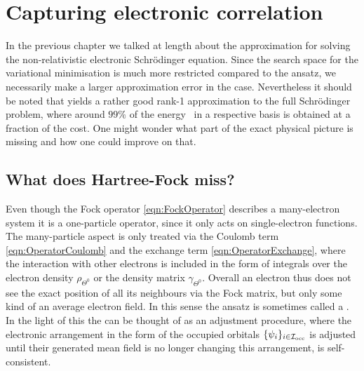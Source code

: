 \section{Capturing electronic correlation}
\label{sec:Correlation}

In the previous chapter we talked at length about the \HF approximation for solving
the non-relativistic electronic Schrödinger equation.
Since the search space for the variational minimisation is much more restricted compared
to the \FCI ansatz,
we necessarily make a larger approximation error in the \HF case.
Nevertheless it should be noted that \HF yields a rather good rank-1
approximation to the full Schrödinger problem,
where around $99\%$ of the \FCI energy~\cite{Jensen2007book} in a respective basis is obtained
at a fraction of the cost.
One might wonder
what part of the exact physical picture \HF is missing and how one could improve on that.

\subsection{What does Hartree-Fock miss?}
Even though the
Fock operator \eqref{eqn:FockOperator} describes a many-electron system
it is a one-particle operator,
since it only acts on single-electron functions.
The many-particle aspect is only treated via the Coulomb term \eqref{eqn:OperatorCoulomb}
and the exchange term \eqref{eqn:OperatorExchange},
where the interaction with
other electrons is included in the form of integrals over
the electron density $\rho_{\Theta^0}$ or the density matrix $\gamma_{\Theta^0}$.
Overall an electron thus does not see the exact position of all its neighbours
via the Fock matrix,
but only some kind of an average electron field.
In this sense the \HF ansatz is sometimes called a .
In the light of this the \SCF can be thought of as an adjustment procedure,
where the electronic arrangement in the form of the occupied \SCF orbitals $\{\psi_i\}_{i\in\mathcal{I}_\text{occ}}$
is adjusted until their generated mean field
is no longer changing this arrangement,
\ie is self-consistent.

